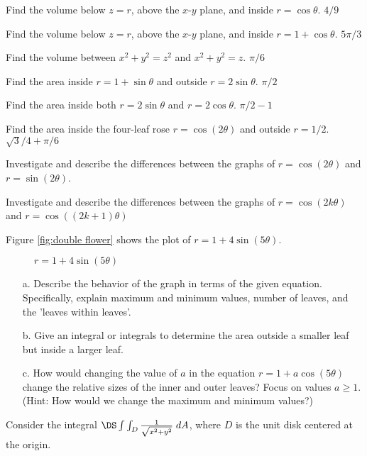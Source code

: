 \begin{multicols}{2}
\problem Find the volume below  $z=r$, above the $x$-$y$ plane, and %
inside $r=\cos\theta$.
\answer
$4/9$
\endanswer

\problem Find the volume below  $z=r$, above the $x$-$y$ plane, and %
inside $r=1+\cos\theta$.
\answer
$5\pi/3$
\endanswer

\problem Find the volume between $x^2+y^2=z^2$ and $x^2+y^2=z$. %
\answer
$\pi/6$
\endanswer

\problem Find the area inside $r=1+\sin\theta$ and outside %
$r=2\sin\theta$. 
\answer
$\pi/2$
\endanswer

\problem Find the area inside both %
$r=2\sin\theta$ and $r=2\cos\theta$. 
\answer
$\pi/2-1$
\endanswer

\problem Find the area inside the four-leaf rose $r=\cos(2\theta)$ %
and outside $r=1/2$.
\answer
$\sqrt3/4+\pi/6$
\endanswer

\problem Investigate and describe the differences between the graphs of %
$r=\cos(2\theta)$ and $r=\sin(2\theta)$.

\problem Investigate and describe the differences between the graphs of %
$r=\cos(2k\theta)$ and $r=\cos((2k+1)\theta)$

\problem Figure \ref{fig:double flower} shows the plot of %
$r=1+4\sin(5\theta)$.

\begin{figure}
    \caption{$r=1+4\sin(5\theta)$}
\end{figure}

\begin{itemize}

\item[a.] Describe the behavior of the graph in terms of the given
    equation.  Specifically, explain maximum and minimum values, number
    of leaves, and the 'leaves within leaves'.

\item[b.] Give an integral or integrals to determine the area outside a
    smaller leaf but inside a larger leaf.


\item[c.] How would changing the value of $a$ in the equation
    $r=1+a\cos(5\theta)$ change the relative sizes of the inner and
    outer leaves? Focus on values $a\geq 1$.  (Hint: How would we change
    the maximum and minimum values?)

\end{itemize}

\problem Consider the integral $\DS\int\int_{D} {1\over\sqrt{x^2+y^2}} \; %
dA$, where $D$ is the unit disk centered at the origin.


\end{multicols}
